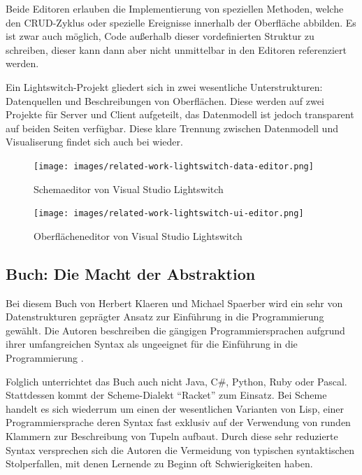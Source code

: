 Beide Editoren erlauben die Implementierung von speziellen Methoden, welche den CRUD-Zyklus oder spezielle Ereignisse innerhalb der Oberfläche abbilden. Es ist zwar auch möglich, Code außerhalb dieser vordefinierten Struktur zu schreiben, dieser kann dann aber nicht unmittelbar in den Editoren referenziert werden.

Ein Lightswitch-Projekt gliedert sich in zwei wesentliche Unterstrukturen: Datenquellen und Beschreibungen von Oberflächen. Diese werden auf zwei Projekte für Server und Client aufgeteilt, das Datenmodell ist jedoch transparent auf beiden Seiten verfügbar. Diese klare Trennung zwischen Datenmodell und Visualiserung findet sich auch bei \idename wieder.

\begin{figure}[p]
  \centering \texttt{[image: images/related-work-lightswitch-data-editor.png]}
  \caption{Schemaeditor von Visual Studio Lightswitch}
  \label{fig:lightswitch-data-designer}
\end{figure}

\begin{figure}[p]
  \centering \texttt{[image: images/related-work-lightswitch-ui-editor.png]}
  \caption{Oberflächeneditor von Visual Studio Lightswitch}
  \label{fig:lightswitch-ui-designer}
\end{figure}

\subsection{Buch: Die Macht der Abstraktion}

Bei diesem Buch von Herbert Klaeren und Michael Spaerber wird ein sehr von Datenstrukturen geprägter Ansatz zur Einführung in die Programmierung gewählt. Die Autoren beschreiben die gängigen Programmiersprachen aufgrund ihrer umfangreichen Syntax als ungeeignet für die Einführung in die Programmierung \cite[2]{macht-der-abstraktion}. 

Folglich unterrichtet das Buch auch nicht Java, C\#, Python, Ruby oder Pascal. Stattdessen kommt der Scheme-Dialekt ``Racket'' zum Einsatz. Bei Scheme handelt es sich wiederrum um einen der wesentlichen Varianten von Lisp, einer Programmiersprache deren Syntax fast exklusiv auf der Verwendung von runden Klammern zur Beschreibung von Tupeln aufbaut. Durch diese sehr reduzierte Syntax versprechen sich die Autoren die Vermeidung von typischen syntaktischen Stolperfallen, mit denen Lernende zu Beginn oft Schwierigkeiten haben.

